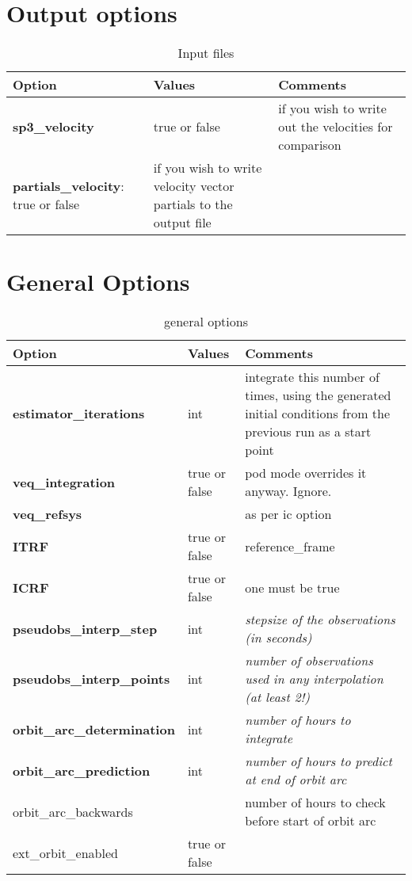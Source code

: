 \section{Output options}
\begin{table}[h!]
	\begin{tabular}{|p{2.5cm}|p{2.5cm}|p{5cm}|}
		\hline
		Option & Values & Comments \\
		\hline
        \textbf{sp3\_velocity} & true or false & if you wish to write out the velocities for comparison \\
        \textbf{partials\_velocity}: true or false & if you wish to write velocity vector partials to the output file\\
		\hline
	\end{tabular}
	\caption{Input files}
	\label{table:label_name}
\end{table}

\section{General Options}
\begin{table}[h!]
	\begin{tabular}{|p{2.5cm}|p{2.5cm}|p{5cm}|}
		\hline
		Option & Values & Comments \\
		\hline
        \textbf{estimator\_iterations} & int & integrate this number of times, using the generated initial conditions from the previous run as a start point\\
        \textbf{veq\_integration}& true or false &   pod mode overrides it anyway. Ignore.\\
        \textbf{veq\_refsys}& &  as per ic option\\
        \hline
        \textbf{ITRF} & true or false & reference\_frame\\
        \textbf{ICRF} & true or false &  one must be true\\       
        \hline
        \textbf{pseudobs\_interp\_step}& int & \emph{stepsize of the observations (in seconds)}\\
        \textbf{pseudobs\_interp\_points}& int & \emph{number of observations used in any interpolation (at least 2!)}\\
        \textbf{orbit\_arc\_determination}& int & \emph{number of hours to integrate}\\
        \textbf{orbit\_arc\_prediction}& int & \emph{number of hours to predict at end of orbit arc}\\
        orbit\_arc\_backwards& & number of hours to check before start of orbit arc\\
        ext\_orbit\_enabled&  true or false & \\ 
		\hline
	\end{tabular}
	\caption{general options}
	\label{table:label_name}
\end{table}

